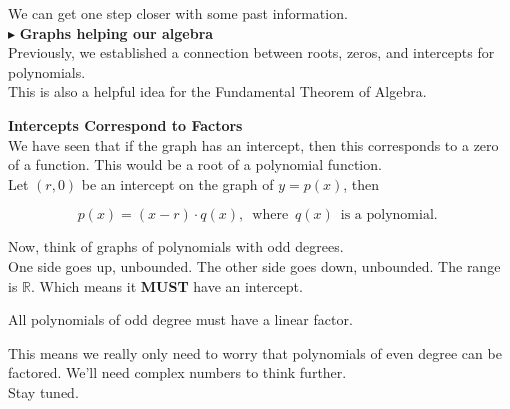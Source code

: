 \documentclass{ximera}
\begin{document}
We can get one step closer with some past information. \\








$\blacktriangleright$ \textbf{\textcolor{blue!55!black}{Graphs helping our algebra}} \\


Previously, we established a connection between roots, zeros, and intercepts for polynomials. \\


This is also a helpful idea for the Fundamental Theorem of Algebra. \\




\begin{idea} \textbf{Intercepts Correspond to Factors} \\



We have seen that if the graph has an intercept, then this corresponds to a zero of a function.  This would be a root of a polynomial function. \\

Let $(r, 0)$ be an intercept on the graph of $y = p(x)$, then 

\[
p(x) = (x-r) \cdot q(x), \, \text{ where } \, q(x) \, \text{ is a polynomial. }
\]

Now, think of graphs of polynomials with odd degrees. \\

One side goes up, unbounded.  The other side goes down, unbounded.  The range is $\mathbb{R}$.  Which means it \textbf{MUST} have an intercept.


All polynomials of odd degree must have a linear factor.




\end{idea}


This means we really only need to worry that polynomials of even degree can be factored.  We'll need complex numbers to think further. \\


Stay tuned.
\end{document}
